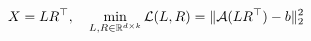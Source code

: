 \documentclass[preview]{standalone}
\begin{document}
\begin{align*}
\special{dvisvgm:raw <g id='unique000'>}X = LR^\top,\quad\min_{L,R\in\mathbb{R}^{d\times k}}\mathcal{L}(L,R)=\|\mathcal{A}(LR^\top)-b\|_2^2\special{dvisvgm:raw </g>}
\end{align*}
\end{document}
